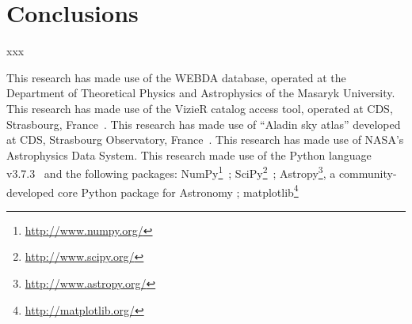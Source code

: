 \documentclass[draft]{aa}
\begin{document}

\section{Conclusions}

xxx

\begin{acknowledgements}
This research has made use of the WEBDA database, operated at the Department of
Theoretical Physics and Astrophysics of the Masaryk University.
%
This research has made use of the VizieR catalog access tool, operated at CDS,
Strasbourg, France~\citep{Ochsenbein_2000}.
%
This research has made use of ``Aladin sky atlas'' developed at
CDS, Strasbourg Observatory, France~\citep{Bonnarel2000,Boch2014}.
%
This research has made use of NASA's Astrophysics Data System.
%
This research made use of the Python language v3.7.3~\citep{vanRossum_1995}
and the following packages:
NumPy\footnote{\url{http://www.numpy.org/}}~\citep{vanDerWalt_2011};
SciPy\footnote{\url{http://www.scipy.org/}}~\citep{Jones_2001};
Astropy\footnote{\url{http://www.astropy.org/}}, a community-developed core
Python package for Astronomy \citep{Astropy_2013};
matplotlib\footnote{\url{http://matplotlib.org/}}~\citep{hunter_2007}
\end{acknowledgements}





\end{document}
